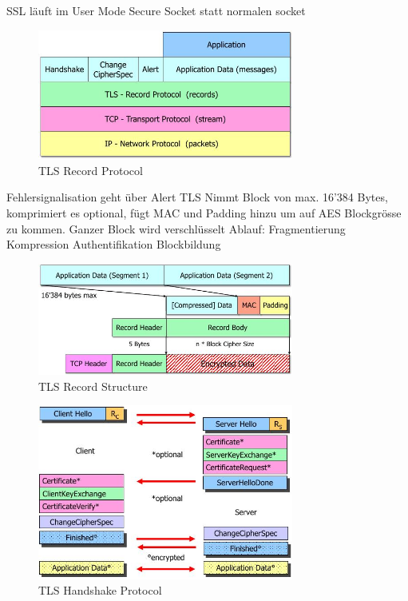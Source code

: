 \documentclass[ngerman,a4paper,12pt]{scrreprt}
\begin{document}
\ul
	\li SSL läuft im User Mode
	\li Secure Socket statt normalen socket
\ulE

\begin{figure}[H]
	\centering
	\includegraphics[width=0.75\textwidth]{img/V9.3.jpg}
	\caption{TLS Record Protocol}
	\label{}
\end{figure}

\ul
	\li Fehlersignalisation geht über Alert
	\li TLS Nimmt Block von max. 16'384 Bytes, komprimiert es optional, fügt MAC und Padding hinzu um auf AES Blockgrösse zu kommen.
	\li Ganzer Block wird verschlüsselt
	\li Ablauf:
		\ol
			\li	Fragmentierung
			\li	Kompression
			\li	Authentifikation
			\li	Blockbildung
		\olE
\ulE

\begin{figure}[H]
	\centering
	\includegraphics[width=0.75\textwidth]{img/V9.4.jpg}
	\caption{TLS Record Structure}
	\label{}
\end{figure}

\begin{figure}[H]
	\centering
	\includegraphics[width=0.75\textwidth]{img/V9.5.jpg}
	\caption{TLS Handshake Protocol}
	\label{}
\end{figure}
\end{document}
